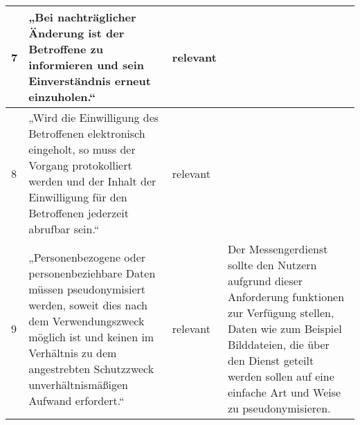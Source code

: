 \begin{longtable}{p{0.6cm}|p{6cm}|p{2cm}|p{6cm}}
    7      & „Bei nachträglicher Änderung ist der Betroffene zu informieren und sein Einverständnis erneut einzuholen.“                                                                                                                                                                                           & relevant           &                                                                                                                                                                                                                                                                                                                                                                                                                                                                                                                                                                     \\ \hline
    8      & „Wird die Einwilligung des Betroffenen elektronisch eingeholt, so muss der Vorgang protokolliert werden und der Inhalt der Einwilligung für den Betroffenen jederzeit abrufbar sein.“                                                                                                                & relevant           &                                                                                                                                                                                                                                                                                                                                                                                                                                                                                                                                                                     \\ \hline
    9      & „Personenbezogene oder personenbeziehbare Daten müssen pseudonymisiert werden, soweit dies nach dem Verwendungszweck möglich ist und keinen im Verhältnis zu dem angestrebten Schutzzweck unverhältnismäßigen Aufwand erfordert.“                                                                    & relevant           & Der Messengerdienst sollte den Nutzern aufgrund dieser Anforderung funktionen zur Verfügung stellen, Daten wie zum Beispiel Bilddateien, die über den Dienst geteilt werden sollen auf eine einfache Art und Weise zu pseudonymisieren.                                                                                                                                                                                                                                                                                                                            \\ \hline

\end{longtable}
